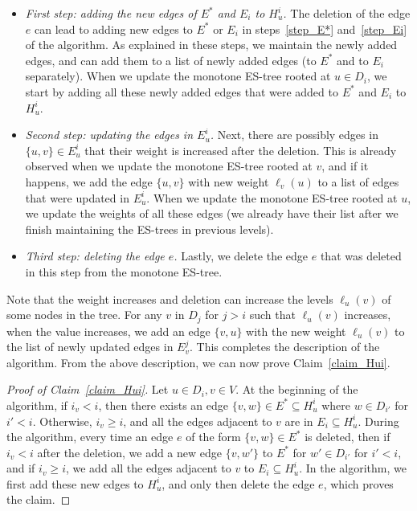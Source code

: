 \documentclass[11pt]{article}
\theoremstyle{definition}
\theoremstyle{remark}
\newcommand{\ytodo}[1]{\todo[color=blue!20]{Y: #1}}
\begin{document}
\begin{itemize}
    \item \textit{First step: adding the new edges of $E^*$ and $E_i$ to $H_u^i$.} The deletion of the edge $e$ can lead to adding new edges to $E^*$ or $E_i$ in steps~\ref{step_E*} and~\ref{step_Ei} of the algorithm. As explained in these steps, we maintain the newly added edges, and can add them to a list of newly added edges (to $E^*$ and to $E_i$ separately). When we update the monotone ES-tree rooted at $u \in D_i$, we start by adding all these newly added edges that were added to $E^*$ and $E_i$ to $H_u^i$.
    \item \textit{Second step: updating the edges in $E_u^i$.} Next, there are possibly edges in $\{u,v\} \in E_u^i$ that their weight is increased after the deletion. This is already observed when we update the monotone ES-tree rooted at $v$, and if it happens, we add the edge $\{u,v\}$ with new weight $\ell_v(u)$ to a list of edges that were updated in $E_u^i$. When we update the monotone ES-tree rooted at $u$, we update the weights of all these edges (we already have their list after we finish maintaining the ES-trees in previous levels).
    \item \textit{Third step: deleting the edge $e$.} Lastly, we delete the edge $e$ that was deleted in this step from the monotone ES-tree. 
\end{itemize}

Note that the weight increases and deletion can increase the levels $\ell_u(v)$ of some nodes in the tree. For any $v$ in $D_j$ for $j > i$ such that $\ell_u(v)$ increases, when the value increases, we add an edge $\{v,u\}$ with the new weight $\ell_u(v)$ to the list of newly updated edges in $E_v^j$. This completes the description of the algorithm.
From the above description, we can now prove Claim~\ref{claim_Hui}. 

\begin{proof}[Proof of Claim~\ref{claim_Hui}]
Let $u \in D_i, v \in V$. At the beginning of the algorithm, if $i_v < i$, then there exists an edge $\{v,w\} \in E^* \subseteq H_u^i$ where $w \in D_{i'}$ for $i' < i$. Otherwise, $i_v \geq i$, and all the edges adjacent to $v$ are in $E_i \subseteq H_u^i$. During the algorithm, every time an edge $e$ of the form $\{v,w\} \in E^*$ is deleted, then if $i_v < i$ after the deletion, we add a new edge $\{v,w'\}$ to $E^*$ for $w' \in D_{i'}$ for $i' < i$, and if $i_v \geq i$, we add all the edges adjacent to $v$ to $E_i \subseteq H_u^i$. In the algorithm, we first add these new edges to $H_u^i$, and only then delete the edge $e$, which proves the claim.
\end{proof}
\end{document}
